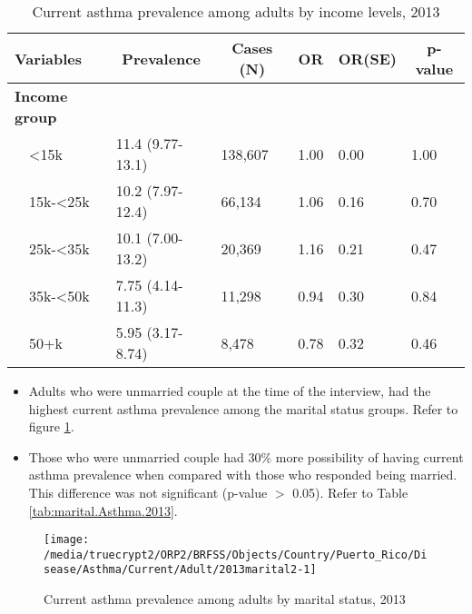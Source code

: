 \begin{table}[H]
\caption{Current asthma prevalence  among adults by income levels, 2013\label{tab:income.Asthma.2013}} 
\begin{center}
\begin{tabular}{llllll}
\hline\hline
\multicolumn{1}{l}{Variables}&\multicolumn{1}{c}{Prevalence}&\multicolumn{1}{c}{Cases (N)}&\multicolumn{1}{c}{OR}&\multicolumn{1}{c}{OR(SE)}&\multicolumn{1}{c}{p-value}\tabularnewline
\hline
{\bfseries Income group}&&&&&\tabularnewline
~~\textless15k&11.4 (9.77-13.1)&138,607&1.00&0.00&1.00\tabularnewline
~~15k-\textless25k&10.2 (7.97-12.4)& 66,134&1.06&0.16&0.70\tabularnewline
~~25k-\textless35k&10.1 (7.00-13.2)& 20,369&1.16&0.21&0.47\tabularnewline
~~35k-\textless50k&7.75 (4.14-11.3)& 11,298&0.94&0.30&0.84\tabularnewline
~~50+k&5.95 (3.17-8.74)&  8,478&0.78&0.32&0.46\tabularnewline
\hline
\end{tabular}\end{center}

\end{table}

 \newpage
\begin{itemize}

\item Adults who were 
unmarried couple at the time of the interview, had the highest current asthma prevalence among the marital status groups. Refer to figure \ref{fig:marital.Asthma.2013}.

\item Those who were unmarried couple had 30\% more possibility of having current asthma prevalence when compared with those who responded being married. This difference was not significant (p-value $>$ 0.05). Refer to Table \ref{tab:marital.Asthma.2013}.

\end{itemize}

\begin{figure}[H]
\caption{Current asthma prevalence among adults by marital status,
         2013}
\label{fig:marital.Asthma.2013}
\begin{knitrout}
\color{fgcolor}

{\centering \texttt{[image: /media/truecrypt2/ORP2/BRFSS/Objects/Country/Puerto\_Rico/Disease/Asthma/Current/Adult/2013marital2-1]} 

}



\end{knitrout}
 \end{figure}

